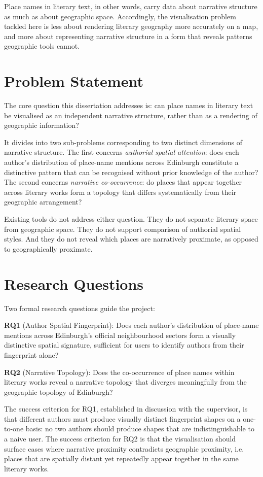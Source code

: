 \documentclass[logo,msc]{infthesis}
\begin{document}
Place names in literary text, in other words, carry data about narrative structure as much as about geographic space. Accordingly, the visualisation problem tackled here is less about rendering literary geography more accurately on a map, and more about representing narrative structure in a form that reveals patterns geographic tools cannot.
 
\section{Problem Statement}
 
The core question this dissertation addresses is: can place names in literary text be visualised as an independent narrative structure, rather than as a rendering of geographic information?
 
It divides into two sub-problems corresponding to two distinct dimensions of narrative structure. The first concerns \emph{authorial spatial attention}: does each author's distribution of place-name mentions across Edinburgh constitute a distinctive pattern that can be recognised without prior knowledge of the author? The second concerns \emph{narrative co-occurrence}: do places that appear together across literary works form a topology that differs systematically from their geographic arrangement?
 
Existing tools do not address either question. They do not separate literary space from geographic space. They do not support comparison of authorial spatial styles. And they do not reveal which places are narratively proximate, as opposed to geographically proximate.
 
\section{Research Questions}
 
Two formal research questions guide the project:
 
\textbf{RQ1} (Author Spatial Fingerprint): Does each author's distribution of place-name mentions across Edinburgh's official neighbourhood sectors form a visually distinctive spatial signature, sufficient for users to identify authors from their fingerprint alone?
 
\textbf{RQ2} (Narrative Topology): Does the co-occurrence of place names within literary works reveal a narrative topology that diverges meaningfully from the geographic topology of Edinburgh?
 
The success criterion for RQ1, established in discussion with the supervisor, is that different authors must produce visually distinct fingerprint shapes on a one-to-one basis: no two authors should produce shapes that are indistinguishable to a naive user. The success criterion for RQ2 is that the visualisation should surface cases where narrative proximity contradicts geographic proximity, i.e. places that are spatially distant yet repeatedly appear together in the same literary works.
 
\end{document}
